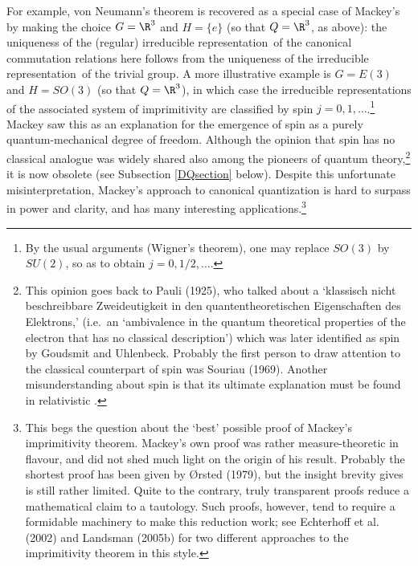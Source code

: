 \documentclass[12pt]{article}
\newcommand{\irrep}{irreducible representation}
\begin{document}
For example, von Neumann's theorem is recovered as a special case of Mackey's by making  the choice $G=\R^3$ and $H=\{e\}$ (so that $Q=\R^3$, as above):
the uniqueness of the (regular) \irrep\ of the canonical commutation relations here  follows from the uniqueness of the \irrep\ of the trivial group.
 A more illustrative example is $G=E(3)$ and $H=SO(3)$ (so that $Q=\R^3$), in which case the \irrep s of the associated system of imprimitivity are classified by spin $j=0,1,\ldots$.\footnote{By the usual arguments (Wigner's theorem), one may replace $SO(3)$ by $SU(2)$, so as to obtain $j=0,1/2,\ldots$.} Mackey saw this as an explanation for the emergence of spin as a purely quantum-mechanical degree of freedom. Although the opinion that spin has no classical analogue  was widely shared also among the pioneers of quantum theory,\footnote{This opinion goes back to Pauli (1925), who talked about a `klassisch nicht beschreibbare Zweideutigkeit in den quantentheoretischen Eigenschaften des Elektrons,' (i.e.\ an `ambivalence in the quantum theoretical properties of the electron that has no classical description') which was later identified as spin by Goudsmit and Uhlenbeck. Probably the first person to draw attention to the classical counterpart of spin was Souriau (1969).
 Another misunderstanding about spin is that its ultimate explanation must be found in relativistic \qm.} it is now  obsolete (see Subsection \ref{DQsection} below). Despite this unfortunate misinterpretation, Mackey's approach to canonical quantization is hard to surpass in power and clarity, and has many interesting applications.\footnote{This begs the question about the `best' possible proof of Mackey's  imprimitivity theorem. Mackey's own proof was rather measure-theoretic in flavour, and did not shed much light on the origin of his result. Probably the shortest proof has been given by \O rsted (1979), 
but the insight brevity gives is still rather limited. Quite to the contrary, truly transparent proofs reduce a mathematical  claim to a tautology. Such proofs, however, tend to require a formidable machinery to make this reduction work; see  Echterhoff et al. (2002) and
Landsman (2005b) for two different approaches to the  imprimitivity theorem in this  style.}  
\end{document}
